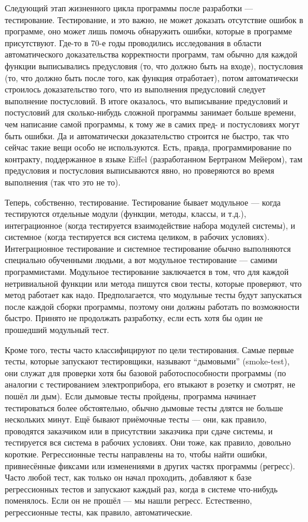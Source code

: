 \documentclass[a5paper]{article}
\begin{document}
Следующий этап жизненного цикла программы после разработки --- тестирование. Тестирование, и это важно, не может доказать отсутствие ошибок в программе, оно может лишь помочь обнаружить ошибки, которые в программе присутствуют. Где-то в 70-е годы проводились исследования в области автоматического доказательства корректности программ, там обычно для каждой функции выписывались предусловия (то, что должно быть на входе), постусловия (то, что должно быть после того, как функция отработает), потом автоматически строилось доказательство того, что из выполнения предусловий следует выполнение постусловий. В итоге оказалось, что выписывание предусловий и постусловий для сколько-нибудь сложной программы занимает больше времени, чем написание самой программы, к тому же в самих пред- и постусловиях могут быть ошибки. Да и автоматически доказательство строится не быстро, так что сейчас такие вещи особо не используются. Есть, правда, программирование по контракту, поддержанное в языке Eiffel (разработанном Бертраном Мейером), там предусловия и постусловия выписываются явно, но проверяются во время выполнения (так что это не то).

Теперь, собственно, тестирование. Тестирование бывает модульное --- когда тестируются отдельные модули (функции, методы, классы, и т.д.), интеграционное (когда тестируется взаимодействие набора модулей системы), и системное (когда тестируется вся система целиком, в рабочих условиях). Интеграционное тестирование и системное тестирование обычно выполняются специально обученными людьми, а вот модульное тестирование --- самими программистами. Модульное тестирование заключается в том, что для каждой нетривиальной функции или метода пишутся свои тесты, которые проверяют, что метод работает как надо. Предполагается, что модульные тесты будут запускаться после каждой сборки программы, поэтому они должны работать по возможности быстро. Принято не продолжать разработку, если есть хотя бы один не прошедший модульный тест.

Кроме того, тесты часто классифицируют по цели тестирования. Самые первые тесты, которые запускают тестировщики, называют ``дымовыми'' (smoke-test), они служат для проверки хотя бы базовой работоспособности программы (по аналогии с тестированием электроприбора, его втыкают в розетку и смотрят, не пошёл ли дым). Если дымовые тесты пройдены, программа начинает тестироваться более обстоятельно, обычно дымовые тесты длятся не больше нескольких минут. Ещё бывают приёмочные тесты --- они, как правило, проводятся заказчиком или в присутствии заказчика при сдаче системы, и тестируется вся система в рабочих условиях. Они тоже, как правило, довольно короткие. Регрессионные тесты направлены на то, чтобы найти ошибки, привнесённые фиксами или изменениями в других частях программы (регресс). Часто любой тест, как только он начал проходить, добавляют к базе регрессионных тестов и запускают каждый раз, когда в системе что-нибудь поменялось. Если он не прошёл --- мы нашли регресс. Естественно, регрессионные тесты, как правило, автоматические.
\end{document}

